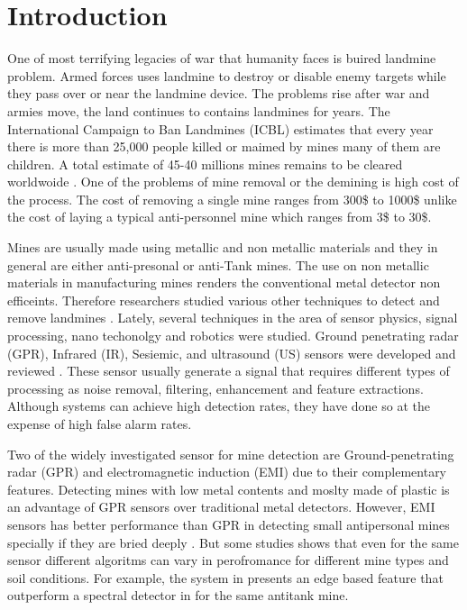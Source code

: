 \documentclass[conference]{IEEEtran}
\begin{document}
\section{Introduction}
\label{sec:introduction}
One of most terrifying legacies of war that humanity faces is buired landmine
problem. Armed forces uses landmine  to destroy or disable enemy targets while
they pass over or near the landmine device. The problems rise after war and
armies move, the land continues to contains landmines for years. The
International Campaign to Ban Landmines (ICBL) \cite{ICBL2007} estimates that every year
there is more than 25,000 people killed or maimed by mines many of them are
children. A total estimate of 45-40 millions mines remains to be cleared
worldwoide \cite{ICBL2007}. One of the problems of mine removal or the demining is
high cost of the process. The cost of removing a single mine ranges from  300\$ to 1000\$
unlike the cost of laying a typical anti-personnel mine which ranges from 3\$ to
30\$.

Mines are usually made using metallic and non metallic materials and they in
general are either anti-presonal or anti-Tank mines. The use on non metallic
materials in manufacturing mines renders the conventional metal detector non
efficeints. Therefore researchers studied various other techniques to detect and remove landmines  \cite{Ho2002,Tan2005,Potin2006}.  Lately, several techniques in the area of sensor physics, signal processing, nano techonolgy and robotics were studied.  Ground penetrating radar (GPR), Infrared (IR), Sesiemic,  and ultrasound (US) sensors were developed and reviewed \cite{Scott2004,Ng2008}. These sensor usually generate a signal that requires different types of processing as noise removal, filtering, enhancement and feature extractions\cite{Ng2008,Potin2006,Wu2009}. Although systems can achieve high detection rates, they have done so at the expense of high false alarm rates.   %

 Two of the widely investigated sensor for mine detection are Ground-penetrating radar (GPR) and electromagnetic induction (EMI)  due to their complementary features. Detecting mines with low metal contents and moslty made of plastic is an advantage of GPR sensors over traditional metal detectors.  However, EMI sensors has better performance than GPR in detecting small antipersonal mines specially if they are bried deeply \cite{Frigui2010}. But some studies shows that even for the same sensor different algoritms can vary in perofromance for different mine types and soil conditions. For example, the system in \cite{Frigui2010}  presents an edge based feature that outperform a spectral detector in \cite{Ho2008} for the same antitank mine.
\end{document}

